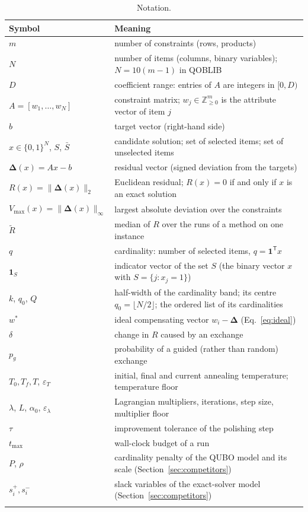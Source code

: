 \documentclass[pdflatex,sn-mathphys-num]{sn-jnl}
\theoremstyle{thmstyleone}
\theoremstyle{thmstylethree}
\newcommand{\Z}{\mathbb{Z}}
\newcommand{\B}{\{0,1\}}
\newcommand{\res}{\boldsymbol{\Delta}}
\begin{document}
\begin{table}[t]
\caption{Notation.}\label{tab:notation}
\begin{tabular*}{\textwidth}{@{\extracolsep\fill}lp{}}
\toprule
Symbol & Meaning \\
\midrule
$m$ & number of constraints (rows, products) \\
$N$ & number of items (columns, binary variables); $N=10(m-1)$ in QOBLIB \\
$D$ & coefficient range: entries of $A$ are integers in $[0,D)$ \\
$A=[w_1,\dots,w_N]$ & constraint matrix; $w_j\in\Z_{\ge0}^m$ is the attribute vector of item $j$ \\
$b$ & target vector (right-hand side) \\
$x\in\B^N$, $S$, $\bar S$ & candidate solution; set of selected items; set of unselected items \\
$\res(x)=Ax-b$ & residual vector (signed deviation from the targets) \\
$R(x)=\|\res(x)\|_2$ & Euclidean residual; $R(x)=0$ if and only if $x$ is an exact solution \\
$V_{\max}(x)=\|\res(x)\|_\infty$ & largest absolute deviation over the constraints \\
$\tilde R$ & median of $R$ over the runs of a method on one instance \\
$q$ & cardinality: number of selected items, $q=\mathbf 1^{\mathsf T}x$ \\
$\mathbf 1_S$ & indicator vector of the set $S$ (the binary vector $x$ with $S=\{j:x_j=1\}$) \\
$k$, $q_0$, $Q$ & half-width of the cardinality band; its centre $q_0=\lfloor N/2\rfloor$; the ordered list of its cardinalities \\
$w^*$ & ideal compensating vector $w_i-\res$ (Eq.~\eqref{eq:ideal}) \\
$\delta$ & change in $R$ caused by an exchange \\
$p_g$ & probability of a guided (rather than random) exchange \\
$T_0, T_f, T$, $\varepsilon_T$ & initial, final and current annealing temperature; temperature floor \\
$\lambda$, $L$, $\alpha_0$, $\varepsilon_\lambda$ & Lagrangian multipliers, iterations, step size, multiplier floor \\
$\tau$ & improvement tolerance of the polishing step \\
$t_{\max}$ & wall-clock budget of a run \\
$P$, $\rho$ & cardinality penalty of the QUBO model and its scale (Section~\ref{sec:competitors}) \\
$s_i^+,s_i^-$ & slack variables of the exact-solver model (Section~\ref{sec:competitors}) \\
\botrule
\end{tabular*}
\end{table}
\end{document}
